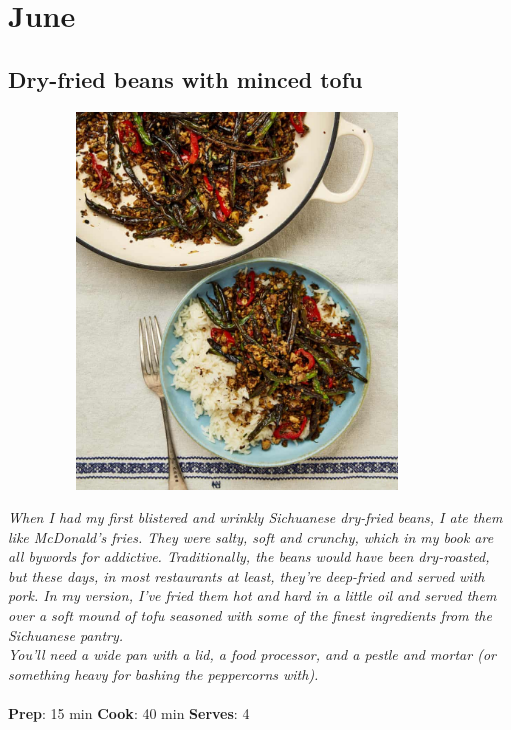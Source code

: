 \documentclass{book}
\begin{document}
\chapter{June}
\section{Dry-fried beans with minced tofu}
\begin{figure}
\centering\includegraphics[width=10cm,height=10cm,keepaspectratio]{Recipe_Pictures/Dry-fried_beans_with_minced_tofu.png}
\end{figure}
\emph{When I had my first blistered and wrinkly Sichuanese dry-fried beans, I ate them like McDonald’s fries. They were salty, soft and crunchy, which in my book are all bywords for addictive. Traditionally, the beans would have been dry-roasted, but these days, in most restaurants at least, they’re deep-fried and served with pork. In my version, I’ve fried them hot and hard in a little oil and served them over a soft mound of tofu seasoned with some of the finest ingredients from the Sichuanese pantry.\\ 
You’ll need a wide pan with a lid, a food processor, and a pestle and mortar (or something heavy for bashing the peppercorns with).}\\\\ 
\textbf{Prep}: 15 min
\textbf{Cook}: 40 min
\textbf{Serves}: 4
\end{document}
